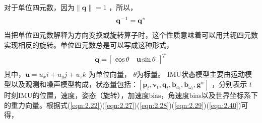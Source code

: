 对于单位四元数，因为$\|\mathbf{q}\|=1 $ ，所以，
\begin{equation}
\label{eqn:2.39}
\setlength{\abovedisplayskip}{6pt}
\setlength{\belowdisplayskip}{6pt}
\mathbf{q}^{-1}=\mathbf{q}^{*}
\end{equation}
当把单位四元数解释为方向变换或旋转算子时，这个性质意味着可以用共轭四元数实现相反的旋转。单位四元数总是可以写成这种形式，
\begin{equation}
\label{eqn:2.40}
\setlength{\abovedisplayskip}{6pt}
\setlength{\belowdisplayskip}{6pt}
\mathbf{q}=\left[ \begin{array}{cc}{\cos \theta} & {\mathbf{u} \sin \theta}\end{array}\right]^T
\end{equation}
其中，$\mathbf{u}=u_{x} i+u_{y} j+u_{z} k $ 为单位向量， $\theta $为标量。
IMU状态模型主要由运动模型以及观测和噪声模型构成，状态量包括：$[\mathbf{p}_t, \mathbf{v}_t, \mathbf{q}_t, \mathbf{b}_{a_t}, \bm{b}_{\omega_t},\mathbf{g}^w]$
 ，分别表示 $t$  时刻IMU的位置，速度，姿态（旋转），加速度bias，角速度bias以及世界坐标系下的重力向量。根据式(\ref{eqn:2.22})(\ref{eqn:2.27})(\ref{eqn:2.28})(\ref{eqn:2.29})(\ref{eqn:2.40})可得，
